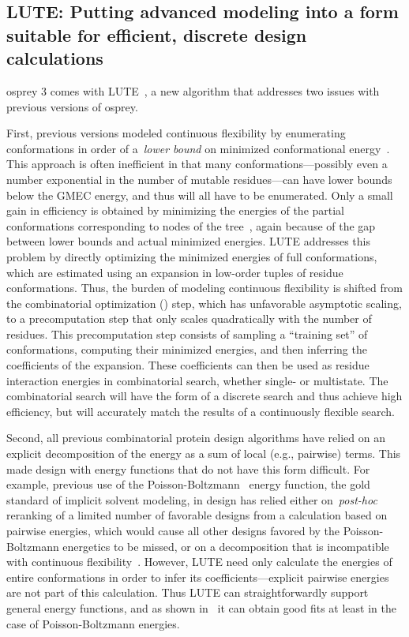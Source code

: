 \subsection{LUTE: Putting advanced modeling into a form suitable for efficient, discrete design calculations}

{\sc osprey} 3 comes with LUTE~\cite{LUTE_RECOMB}, a new algorithm that addresses two issues with previous versions of {\sc osprey}.  

First, previous versions modeled continuous flexibility by enumerating conformations in order of a~\textit{lower bound} on minimized conformational energy~\cite{minDEE,iMinDEE}.  This approach is often inefficient in that many conformations---possibly even a number exponential in the number of mutable residues---can have lower bounds below the GMEC energy, and thus will all have to be enumerated.  Only a small gain in efficiency is obtained by minimizing the energies of the partial conformations corresponding to nodes of the \as tree~\cite{EPIC}, again because of the gap between lower bounds and actual minimized energies.  LUTE addresses this problem by directly optimizing the minimized energies of full conformations, which are estimated using an expansion in low-order tuples of residue conformations.  Thus, the burden of modeling continuous flexibility is shifted from the combinatorial optimization (\as) step, which has unfavorable asymptotic scaling, to a precomputation step that only scales quadratically with the number of residues.  This precomputation step consists of sampling a ``training set'' of conformations, computing their minimized energies, and then inferring the coefficients of the expansion.  These coefficients can then be used as residue interaction energies in combinatorial search, whether single- or multistate.  The combinatorial search will have the form of a discrete search and thus achieve high efficiency, but will accurately match the results of a continuously flexible search.  

Second, all previous combinatorial protein design algorithms have relied on an explicit decomposition of the energy as a sum of local (e.g., pairwise) terms.  This made design with energy functions that do not have this form difficult. For example, previous use of the Poisson-Boltzmann~\cite{PBSA} energy function, the gold standard of implicit solvent modeling, in design has relied either on~\textit{post-hoc} reranking of a limited number of favorable designs from a calculation based on pairwise energies, which would cause all other designs favored by the Poisson-Boltzmann energetics to be missed, or on a decomposition that is incompatible with continuous flexibility~\cite{PB_pairwise}.  However, LUTE need only calculate the energies of entire conformations in order to infer its coefficients---explicit pairwise energies are not part of this calculation.  Thus LUTE can straightforwardly support general energy functions, and as shown in~\cite{LUTE_RECOMB} it can obtain good fits at least in the case of Poisson-Boltzmann energies.  

